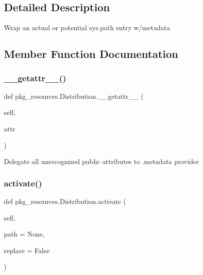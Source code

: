 \subsection{Detailed Description}
\begin{DoxyVerb}Wrap an actual or potential sys.path entry w/metadata\end{DoxyVerb}
 

\subsection{Member Function Documentation}
\mbox{\label{classpkg__resources_1_1_distribution_a60734974b4449119f97e844be57ba38f}} 
\subsubsection{\texorpdfstring{\+\_\+\+\_\+getattr\+\_\+\+\_\+()}{\_\_getattr\_\_()}}
{\footnotesize\ttfamily def pkg\+\_\+resources.\+Distribution.\+\_\+\+\_\+getattr\+\_\+\+\_\+ (\begin{DoxyParamCaption}\item[{}]{self,  }\item[{}]{attr }\end{DoxyParamCaption})}

\begin{DoxyVerb}Delegate all unrecognized public attributes to .metadata provider\end{DoxyVerb}
 \mbox{\label{classpkg__resources_1_1_distribution_a4c4474f066527ee18c2dc15af67911df}} 
\subsubsection{\texorpdfstring{activate()}{activate()}}
{\footnotesize\ttfamily def pkg\+\_\+resources.\+Distribution.\+activate (\begin{DoxyParamCaption}\item[{}]{self,  }\item[{}]{path = {\ttfamily None},  }\item[{}]{replace = {\ttfamily False} }\end{DoxyParamCaption})}

